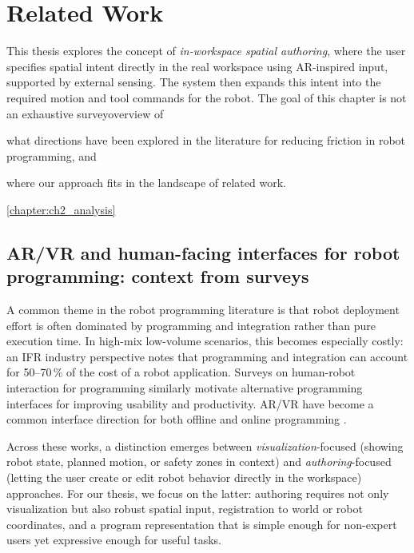 \chapter{Related Work} \label{chapter:ch1_related_work}

This thesis explores the concept of \emph{in-workspace spatial authoring}, where the user specifies spatial intent directly in the real workspace using AR-inspired input, supported by external sensing. The system then expands this intent into the required motion and tool commands for the robot. The goal of this chapter is not an exhaustive survey\DIFdelbegin {}\DIFdelend \DIFaddbegin {}\DIFaddend overview of
\begin{enumerate*}[label=(\roman*)]
    \item what directions have been explored in the literature for reducing friction in robot programming, and
    \item where our approach fits in the landscape of related work.
\end{enumerate*}
\DIFaddbegin {}\autoref{chapter:ch2_analysis}\DIFaddend 

\section[AR/VR interfaces: context from surveys]{AR/VR and human-facing interfaces for robot programming: context from surveys}

A common theme in the robot programming literature is that robot deployment effort is often dominated by programming and integration rather than pure execution time. In high-mix low-volume scenarios, this becomes especially costly: an IFR industry perspective \cite{IFR2023TraditionalVsNew} notes that programming and integration can account for 50--70\,\% of the cost of a robot application. Surveys on human-robot interaction for programming \cite{VILLANI201866} similarly motivate alternative programming interfaces for improving usability and productivity. AR/VR have become a common interface direction for both offline and online programming \cite{Makhataeva2020, DIANATFAR2021407}.

Across these works, a distinction emerges between \emph{visualization}-focused (showing robot state, planned motion, or safety zones in context) and \emph{authoring}-focused (letting the user create or edit robot behavior directly in the workspace) approaches. For our thesis, we focus on the latter: authoring requires not only visualization but also robust spatial input, registration to world or robot coordinates, and a program representation that is simple enough for non-expert users yet expressive enough for useful tasks. 

